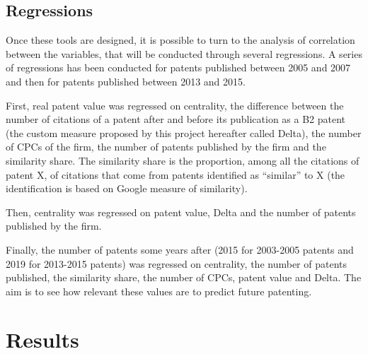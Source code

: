 \documentclass[12pt]{article}
\begin{document}
\subsection{Regressions}
Once these tools are designed, it is possible to turn to the analysis of correlation between the variables, that will be conducted through several regressions. A series of regressions has been conducted for patents published between 2005 and 2007 and then for patents published between 2013 and 2015. 

First, real patent value was regressed on centrality, the difference between the number of citations of a patent after and before its publication as a B2 patent (the custom measure proposed by this project hereafter called Delta), the number of CPCs of the firm, the number of patents published by the firm and the similarity share. The similarity share is the proportion, among all the citations of patent X, of citations that come from patents identified as “similar” to X (the identification is based on Google measure of similarity). 

Then, centrality was regressed on patent value, Delta and the number of patents published by the firm. 

Finally, the number of patents some years after (2015 for 2003-2005 patents and 2019 for 2013-2015 patents) was regressed on centrality, the number of patents published, the similarity share, the number of CPCs, patent value and Delta. The aim is to see how relevant these values are to predict future patenting. 

\section{Results}
\end{document}
